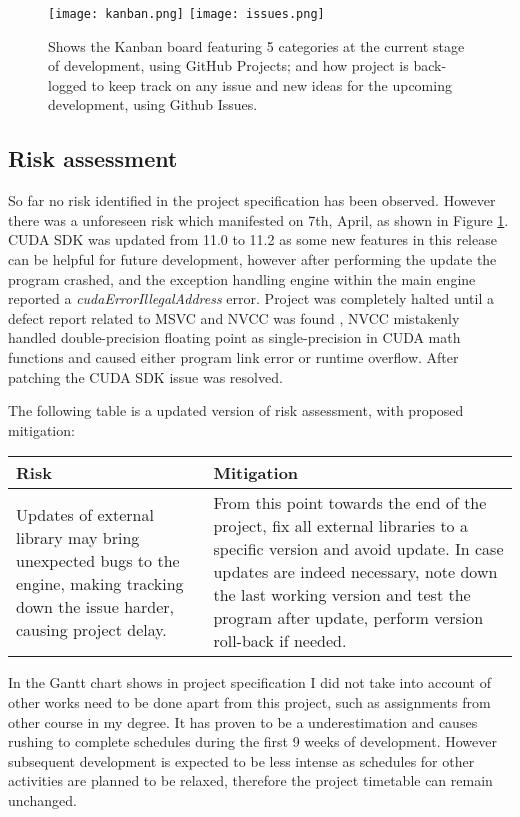 \documentclass[oneside, a4paper]{article}
\begin{document}
    \begin{figure}[H]
        \texttt{[image: kanban.png]}
        \texttt{[image: issues.png]}
        \caption{Shows the Kanban board featuring 5 categories at the current stage of development, using GitHub Projects; and how project is back-logged to keep track on any issue and new ideas for the upcoming development, using Github Issues.}
        \label{log}
    \end{figure}

    \subsection{Risk assessment}
    So far no risk identified in the project specification has been observed. However there was a unforeseen risk which manifested on 7th, April, as shown in Figure \ref{log}. CUDA SDK was updated from 11.0 to 11.2 as some new features in this release can be helpful for future development, however after performing the update the program crashed, and the exception handling engine within the main engine reported a \textit{cudaErrorIllegalAddress} error. Project was completely halted until a defect report related to MSVC and NVCC was found \cite{cuda1102_defect}, NVCC mistakenly handled double-precision floating point as single-precision in CUDA math functions and caused either program link error or runtime overflow. After patching the CUDA SDK issue was resolved.

    The following table is a updated version of risk assessment, with proposed mitigation:

    \begin{center}
        \begin{tabular}{ | p{7.5cm} || p{7.5cm} | }
            \hline
            Risk & Mitigation \\
            \hline
            \hline
            Updates of external library may bring unexpected bugs to the engine, making tracking down the issue harder, causing project delay. &
            From this point towards the end of the project, fix all external libraries to a specific version and avoid update. In case updates are indeed necessary, note down the last working version and test the program after update, perform version roll-back if needed. \\
            \hline
        \end{tabular}
    \end{center}

    In the Gantt chart shows in project specification I did not take into account of other works need to be done apart from this project, such as assignments from other course in my degree. It has proven to be a underestimation and causes rushing to complete schedules during the first 9 weeks of development. However subsequent development is expected to be less intense as schedules for other activities are planned to be relaxed, therefore the project timetable can remain unchanged.
\end{document}
